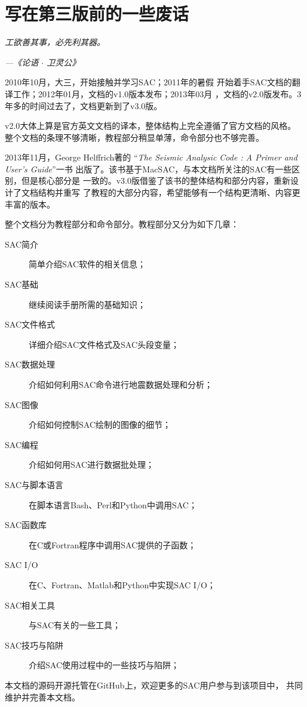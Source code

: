 {\section*{写在第三版前的一些废话}}

\begin{shadequote*}
\Large\emph{工欲善其事，必先利其器。}
\par\hfill\emph{\normalsize---《论语 $\cdot$ 卫灵公》}
\end{shadequote*}

2010年10月，大三，开始接触并学习SAC；2011年的暑假
开始着手SAC文档的翻译工作；2012年01月，文档的v1.0版本发布；2013年03月
，文档的v2.0版发布。3年多的时间过去了，文档更新到了v3.0版。

v2.0大体上算是官方英文文档的译本，整体结构上完全遵循了官方文档的风格。
整个文档的条理不够清晰，教程部分稍显单薄，命令部分也不够完善。

2013年11月，George Helffrich著的
``\emph{The Seismic Analysic Code : A Primer and User's Guide}''一书
出版了。该书基于MacSAC，与本文档所关注的SAC有一些区别，但是核心部分是
一致的。v3.0版借鉴了该书的整体结构和部分内容，重新设计了文档结构并重写
了教程的大部分内容，希望能够有一个结构更清晰、内容更丰富的版本。

整个文档分为教程部分和命令部分。教程部分又分为如下几章：
\begin{description}
\item[SAC简介] 简单介绍SAC软件的相关信息；
\item[SAC基础] 继续阅读手册所需的基础知识；
\item[SAC文件格式] 详细介绍SAC文件格式及SAC头段变量；
\item[SAC数据处理] 介绍如何利用SAC命令进行地震数据处理和分析；
\item[SAC图像] 介绍如何控制SAC绘制的图像的细节；
\item[SAC编程] 介绍如何用SAC进行数据批处理；
\item[SAC与脚本语言] 在脚本语言Bash、Perl和Python中调用SAC；
\item[SAC函数库] 在C或Fortran程序中调用SAC提供的子函数；
\item[SAC I/O] 在C、Fortran、Matlab和Python中实现SAC I/O；
\item[SAC相关工具] 与SAC有关的一些工具；
\item[SAC技巧与陷阱] 介绍SAC使用过程中的一些技巧与陷阱；
\end{description}

本文档的源码开源托管在GitHub上，欢迎更多的SAC用户参与到该项目中，
共同维护并完善本文档。

